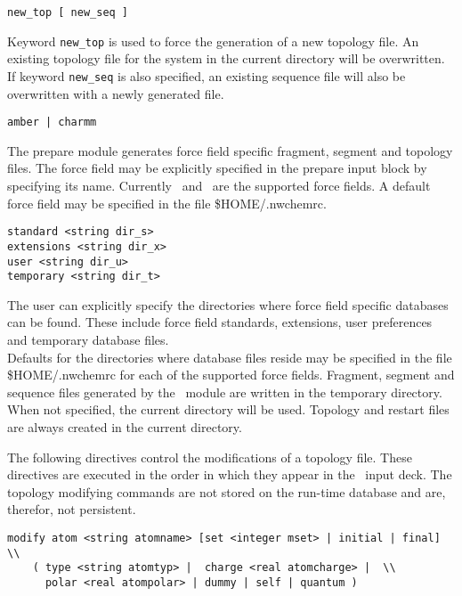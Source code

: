 \begin{verbatim}
new_top [ new_seq ]
\end{verbatim}

Keyword \verb+new_top+ is used to force the generation of a new topology 
file. An existing topology file for the system in the current directory
will be overwritten. If keyword \verb+new_seq+ is also specified, an
existing sequence file will also be overwritten with a newly generated
file.

\begin{verbatim}
amber | charmm
\end{verbatim}

The prepare module generates force field specific fragment, segment and 
topology files. The force field may be explicitly specified in the prepare 
input block by specifying its name.
Currently \amber\ and \charmm\ are the supported force fields.
A default force field may be specified in the file \$HOME/.nwchemrc. 

\begin{verbatim}
standard <string dir_s>
extensions <string dir_x>
user <string dir_u>
temporary <string dir_t>
\end{verbatim}

The user can explicitly specify the directories where force field
specific databases can be found. These include force field standards,
extensions, user preferences and temporary database files.\\
Defaults for the directories where database files reside may be specified 
in the file \$HOME/.nwchemrc for each of the supported force fields. 
Fragment, segment and sequence files generated by the \prepare\ module are 
written in the temporary directory. When not specified, the current 
directory will be used. 
Topology and restart files are always created in the current directory.


The following directives control the modifications of a
topology file. These directives are executed in the order in which 
they appear in the \prepare\ input deck. The topology modifying
commands are not stored on the run-time database and are, therefor,
not persistent.

\begin{verbatim}
modify atom <string atomname> [set <integer mset> | initial | final] \\
	( type <string atomtyp> |  charge <real atomcharge> |  \\
	  polar <real atompolar> | dummy | self | quantum )
\end{verbatim}

